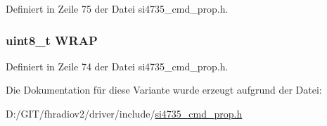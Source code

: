 Definiert in Zeile 75 der Datei si4735\+\_\+cmd\+\_\+prop.\+h.

\hypertarget{unionfm__seek__start__arg1_af88f4878136175a8c7ac89aba1be647b}{}
\subsubsection[{W\+R\+A\+P}]{\setlength{\rightskip}{0pt plus 5cm}uint8\+\_\+t W\+R\+A\+P}\label{unionfm__seek__start__arg1_af88f4878136175a8c7ac89aba1be647b}


Definiert in Zeile 74 der Datei si4735\+\_\+cmd\+\_\+prop.\+h.



Die Dokumentation für diese Variante wurde erzeugt aufgrund der Datei\+:\begin{DoxyCompactItemize}
\item 
D\+:/\+G\+I\+T/fhradiov2/driver/include/\hyperlink{si4735__cmd__prop_8h}{si4735\+\_\+cmd\+\_\+prop.\+h}\end{DoxyCompactItemize}
